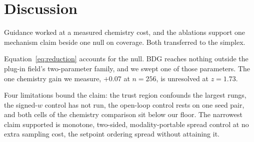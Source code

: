 \section{Discussion}

Guidance worked at a measured chemistry cost, and the ablations support one mechanism
claim beside one null on coverage. Both transferred to the simplex.

Equation~\eqref{eq:reduction} accounts for the null. BDG reaches nothing outside the
plug-in field's two-parameter family, and we swept one of those parameters. The one
chemistry gain we measure, $+0.07$ at $n{=}256$, is unresolved at $z=1.73$.

Four limitations bound the claim: the trust region confounds the largest rungs, the
signed-$w$ control has not run, the open-loop control rests on one seed pair, and both
cells of the chemistry comparison sit below our floor. The narrowest claim supported is monotone, two-sided,
modality-portable spread control at no extra sampling cost, the setpoint ordering spread
without attaining it.
